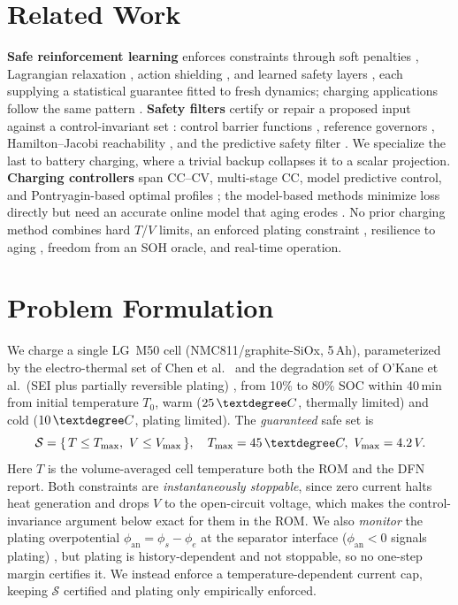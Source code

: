 \documentclass[conference]{IEEEtran}
\newcommand{\SI}[2]{#1\,#2}
\newcommand{\degreeCelsius}{\textdegree C}
\begin{document}
\section{Related Work}
\textbf{Safe reinforcement learning} enforces constraints through soft penalties
\cite{iecon2022penalty}, Lagrangian relaxation \cite{stooke2020pid,achiam2017cpo}, action shielding
\cite{alshiekh2018shielding}, and learned safety layers \cite{cao2025adaptive,dalal2018safe}, each
supplying a statistical guarantee fitted to fresh dynamics; charging applications follow the same
pattern \cite{wei2022ddpg,kim2020rl,attia2020}. \textbf{Safety filters} certify or repair a proposed
input against a control-invariant set \cite{blanchini2008settheoretic}: control barrier functions
\cite{ames2019cbf}, reference governors \cite{gilbert2002governor}, Hamilton--Jacobi reachability
\cite{bansal2017hj}, and the predictive safety filter \cite{wabersich2021psf}. We specialize the last
to battery charging, where a trivial backup collapses it to a scalar projection. \textbf{Charging
controllers} span CC--CV, multi-stage CC, model predictive control, and Pontryagin-based optimal
profiles \cite{pmp2021,moura2017}; the model-based methods minimize loss directly but need an
accurate online model that aging erodes \cite{plett2015,waag2014}. No prior charging method combines
hard $T$/$V$ limits, an enforced plating constraint \cite{yang2017plating,arora1998}, resilience to
aging \cite{kirkaldy2024}, freedom from an SOH oracle, and real-time operation.

\section{Problem Formulation}
We charge a single LG~M50 cell (NMC811/graphite-SiOx, \SI{5}{Ah}), parameterized by the electro-thermal set of
Chen et al.\ \cite{chen2020} and the degradation set of O'Kane et al.\ (SEI plus partially
reversible plating) \cite{okane2022}, from 10\% to 80\% SOC within \SI{40}{min} from initial
temperature $T_0$, warm ($\SI{25}{\degreeCelsius}$, thermally limited) and cold
($\SI{10}{\degreeCelsius}$, plating limited). The \emph{guaranteed} safe set is
\begin{equation}
\mathcal{S}=\{\,T\le T_{\max},\ V\le V_{\max}\,\},\quad T_{\max}=\SI{45}{\degreeCelsius},\
V_{\max}=\SI{4.2}{V}.
\end{equation}
Here $T$ is the volume-averaged cell temperature both the ROM and the DFN report. Both constraints are \emph{instantaneously stoppable}, since
zero current halts heat generation and drops $V$ to the open-circuit voltage, which makes the
control-invariance argument below exact for them in the ROM. We also \emph{monitor} the plating
overpotential $\phi_{\mathrm{an}}=\phi_s-\phi_e$ at the separator interface ($\phi_{\mathrm{an}}<0$
signals plating) \cite{yang2017plating}, but plating is history-dependent and not
stoppable, so no one-step margin certifies it. We instead enforce a temperature-dependent current
cap, keeping $\mathcal S$ certified and plating only empirically enforced.
\end{document}

